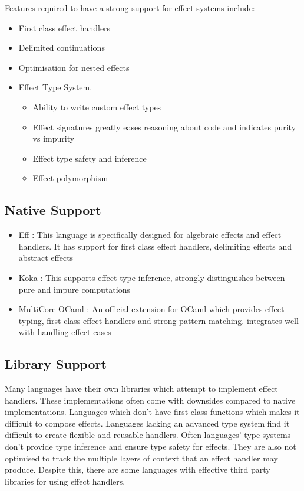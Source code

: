 \documentclass[logo,bsc,singlespacing,parskip]{infthesis}
\begin{document}
Features required to have a strong support for effect systems include: 
\begin{itemize}
    \item First class effect handlers
    \item Delimited continuations
    \item Optimisation for nested effects 
    \item Effect Type System. 
    \begin{itemize}
        \item Ability to write custom effect types 
        \item Effect signatures greatly eases reasoning about code and indicates purity vs impurity
        \item Effect type safety and inference
        \item Effect polymorphism


    \end{itemize}
    
\end{itemize}
 
\subsection{Native Support}

\begin{itemize}
    \item Eff \cite{eff_effects}: This language is specifically designed for algebraic effects and effect handlers. It has support for first class effect handlers, delimiting effects and abstract effects
    \item Koka \cite{koka_effects}: This supports effect type inference, strongly distinguishes between pure and impure computations
    \item MultiCore OCaml \cite{ocaml_effects}: An official extension for OCaml which provides effect typing, first class effect handlers and strong pattern matching. integrates well with handling effect cases
\end{itemize}


\subsection{Library Support}
Many languages have their own libraries which attempt to implement effect handlers. These implementations often come with downsides compared to native implementations. Languages which don’t have first class functions which makes it difficult to compose effects. Languages lacking an advanced type system find it difficult to create flexible and reusable handlers. Often languages’ type systems don’t provide type inference and ensure type safety for effects. They are also not optimised to track the multiple layers of context that an effect handler may produce. Despite this, there are some languages with effective third party libraries for using effect handlers.
\end{document}
